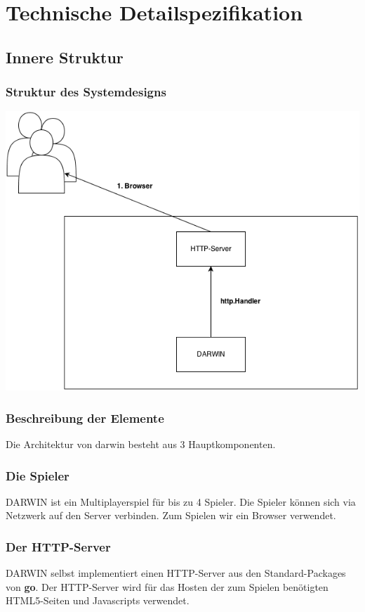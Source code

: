 \section{Technische Detailspezifikation}
\subsection{Innere Struktur}
\subsubsection{Struktur des Systemdesigns}
\includegraphics[width=\linewidth]{simplearch.png}
\subsubsection{Beschreibung der Elemente}
Die Architektur von darwin besteht aus 3 Hauptkomponenten.
\subsubsection{Die Spieler}
DARWIN ist ein Multiplayerspiel für bis zu 4 Spieler. Die Spieler können sich via
Netzwerk auf den Server verbinden. Zum Spielen wir ein Browser verwendet.
\subsubsection{Der HTTP-Server}
DARWIN selbst implementiert einen HTTP-Server aus den Standard-Packages von \textbf{go}.
Der HTTP-Server wird für das Hosten der zum Spielen benötigten HTML5-Seiten und
Javascripts verwendet.
